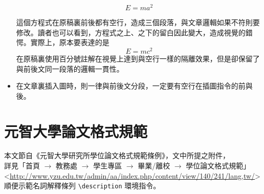 \begin{itemize}
		\begin{equation}
		E = ma^2
		\label{eq:ma2}
		\end{equation}
		
	這個方程式在原稿裏前後都有空行，造成三個段落，與文章邏輯如果不符則要修改。讀者也可以看到，方程式之上、之下的留白因此變大，造成視覺的錯愕。實際上，原本要表達的是
%
		\begin{equation}
		E = mc^2
		\label{eq:mc2}
		\end{equation}
%
在原稿裏使用百分號註解在視覺上達到與空行一樣的隔離效果，但是卻保留了與前後文同一段落的邏輯一貫性。

	\item 在文章裏插入圖時，則一律與前後文分段，一定要有空行在插圖指令的前與後。
	\end{itemize}


\chapter{元智大學論文格式規範}
本文節自《元智大學研究所學位論文格式規範條例》，文中所提之附件，\\
詳見「首頁 $\rightarrow$ 教務處 $\rightarrow$ 學生專區 $\rightarrow$ 畢業/離校 $\rightarrow$ 學位論文格式規範」\\
\textless\url{http://www.yzu.edu.tw/admin/aa/index.php/content/view/140/241/lang,tw/}\textgreater\\
順便示範名詞解釋條列 \verb+\description+ 環境指令。

